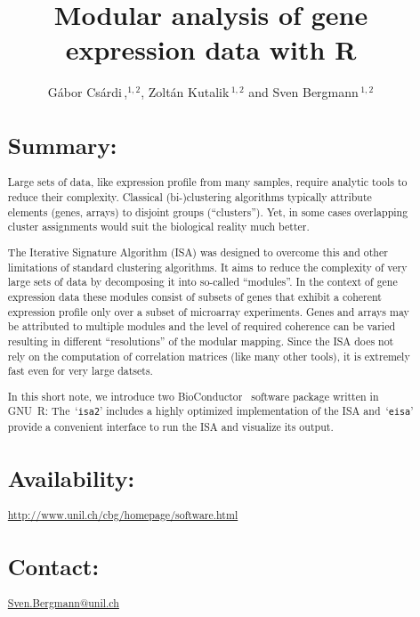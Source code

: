 \documentclass{bioinfo}
\newcommand{\Rpackage}[1]{`\texttt{#1}'}
\begin{document}

\title[Modular analysis]{Modular analysis of gene expression data with R}
\author[G\'abor Cs\'ardi \textit{et~al}]{G\'abor Cs\'ardi\,,$^{1,2}$,
  Zolt\'an Kutalik\,$^{1,2}$ and Sven Bergmann\,$^{1,2}$}
\address{$^{1}$Department of Medical Genetics, and
  $^{2}$Swiss Institute of Bioinformatics,
  University of Lausanne, Rue de Bugnon 27, CH-1005 Lausanne,
  Switzerland.}



\maketitle

\begin{abstract}
\section{Summary:}
Large sets of data, like expression profile from many samples, require
analytic tools to reduce their complexity. Classical (bi-)clustering
algorithms typically attribute elements (genes, arrays) to disjoint groups
(``clusters''). Yet, in some cases overlapping cluster assignments would suit
the biological reality much better.

The Iterative Signature Algorithm (ISA) was designed to overcome this and
other limitations of standard clustering algorithms. It aims to reduce the
complexity of very large sets of data by decomposing it into so-called
``modules''. In the context of gene expression data these modules consist of
subsets of genes that exhibit a coherent expression profile only over a
subset of microarray experiments. Genes and arrays may be attributed to
multiple modules and the level of required coherence can be varied resulting
in different ``resolutions'' of the modular mapping. Since the ISA does not
rely on the computation of correlation matrices (like many other tools), it
is extremely fast even for very large datsets.

In this short note, we introduce two BioConductor~\cite{BioC} software
package written in GNU~R: The~\Rpackage{isa2} includes a highly optimized
implementation of the ISA and~\Rpackage{eisa} provide a convenient interface
to run the ISA and visualize its output.

\section{Availability:}
\href{http://www.unil.ch/cbg/homepage/software.html}%
{http://www.unil.ch/cbg/homepage/software.html}
\section{Contact:} \href{Sven.Bergmann@unil.ch}{Sven.Bergmann@unil.ch}
\end{abstract}
\end{document}
